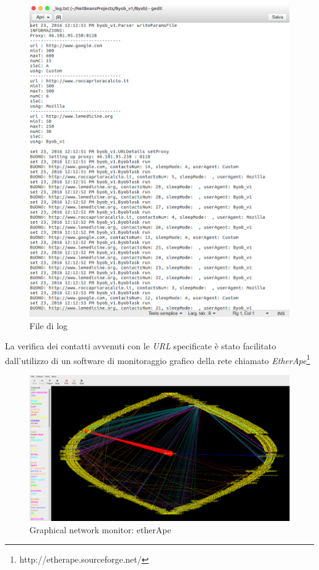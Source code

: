 \begin{figure}[htp]
\centering
\includegraphics[width=0.7\linewidth]{imgs/log}
\caption{File di log}
\label{fig:log}
\end{figure}

\newpage
La verifica dei contatti avvenuti con le \textit{URL} specificate \`{e} stato facilitato dall'utilizzo di un software di monitoraggio grafico della rete chiamato \textit{EtherApe}\footnote{http://etherape.sourceforge.net/}

\vspace{0.5cm}
\begin{figure}[htp]
\centering
\includegraphics[width=1\linewidth]{imgs/etherape}
\caption{Graphical network monitor: etherApe}
\label{fig:etherape}
\end{figure}

